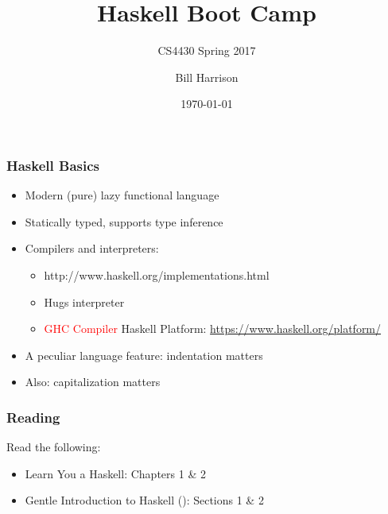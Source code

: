 \documentclass{beamer}
\title{Haskell Boot Camp}
\subtitle{CS4430 Spring 2017}
\author{Bill Harrison}
\date{\today}
\newcommand{\forget}[1]{}
\begin{document}
\frame{\titlepage}

\forget{
\section[Outline]{}
\frame{\tableofcontents}
\section{Introduction}
\frame
{
  \frametitle{Features of the Beamer Class}

  \begin{itemize}
  \item<1-> Normal LaTeX class.
  \item<2-> Easy overlays.
  \item<3-> No external programs needed.      
  \end{itemize}
}
}

\frame
{
    \frametitle{Haskell Basics}
\begin{itemize}
\item Modern (pure) lazy functional language
\item Statically typed, supports type inference
\item Compilers and interpreters:
\begin{itemize}
\item http://www.haskell.org/implementations.html
\item Hugs interpreter
\item \textcolor{red}{GHC Compiler} Haskell Platform: \url{https://www.haskell.org/platform/}
\end{itemize}
\item A peculiar language feature: indentation matters
\item Also: capitalization matters
\end{itemize}
}


\begin{frame}[fragile]
\frametitle{Reading}

Read the following:
\begin{itemize}
\item Learn You a Haskell: Chapters 1 \& 2

\item Gentle Introduction to Haskell ({\scriptsize{}}): Sections 1 \& 2
\end{itemize}
\end{frame}
\end{document}
